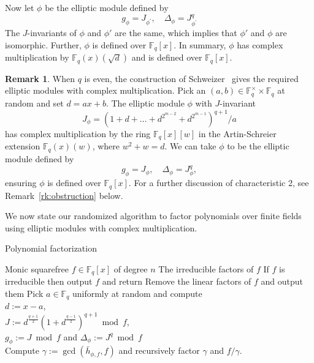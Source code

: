 \documentclass[11pt]{article}
\theoremstyle{definition}
\newtheorem{remark}{Remark}
\def\F{\ensuremath{\mathbb{F}}}
\newcommand{\D}{\Delta}
\begin{document}
Now let $\phi$ be the elliptic module defined by 
\[g_\phi = J_{\phi^\prime}, \quad  \D_\phi = J_{\phi^\prime}^{q} \]
The $J$-invariants of $\phi$ and $\phi'$ are the same, which implies that $\phi'$
and $\phi$ are isomorphic. Further, $\phi$ is defined over
$\F_q[x]$. In summary, $\phi$ has complex multiplication by
$\F_q(x)(\sqrt{d})$ and is defined over $\F_q[x]$.


\begin{remark}
When $q$ is even, the construction of Schweizer~\cite[Theorem
  6]{Schweizer97} gives the required elliptic modules with complex
multiplication. Pick an $(a,b)\in \F_q^\times \times \F_q$ at random
and set $d=ax+b$. The elliptic module $\phi$ with $J$-invariant
\[
J_{\phi} = \left(1+d+\ldots+d^{2^{m-2}}+d^{2^{m-1}}\right)^{q+1}/a
\]
has complex multiplication by the ring $\F_q[x][w]$ in the
Artin-Schreier extension $\F_q(x)(w)$, where $w^2+w=d$. We can take $\phi$ to
be the elliptic module defined by
\[g_\phi = J_{\phi}, \quad  \D_\phi = J_{\phi}^{q}, \]
ensuring $\phi$ is defined over $\F_q[x]$. For a further discussion
of characteristic 2, see Remark~\ref{rk:obstruction} below. 
\end{remark}

\noindent We now state our randomized algorithm to factor polynomials over
finite fields using elliptic modules with complex
multiplication. 

\begin{algorithm}[H]
  \caption{Polynomial factorization}
  \label{alg:factoring}
  \begin{algorithmic}[1]
    \REQUIRE Monic squarefree $f \in \F_q[x]$ of degree $n$
    \ENSURE The irreducible factors of $f$
    \STATE If $f$ is irreducible then output $f$ and return
    \STATE\label{step:fac-2}
    Remove the linear factors of $f$ and output them
    \STATE\label{step:fac-3}
    Pick $a \in \F_q$ uniformly at random and compute \\
    $d := x - a$,\\
    $J:=d^{\frac{q+1}{2}}\left(1+d^{\frac{q-1}{2}}\right)^{q+1} \bmod f$, \\
	$g_\phi:=J \bmod f$ and	$\Delta_\phi := J^q \bmod f$\\	
    \STATE\label{step:fac-split}
    Compute $\gamma := \gcd(\bar h_{\phi,f}, f)$ and recursively factor $\gamma$ and $f/\gamma$.
  \end{algorithmic}
\end{algorithm}
\end{document}
